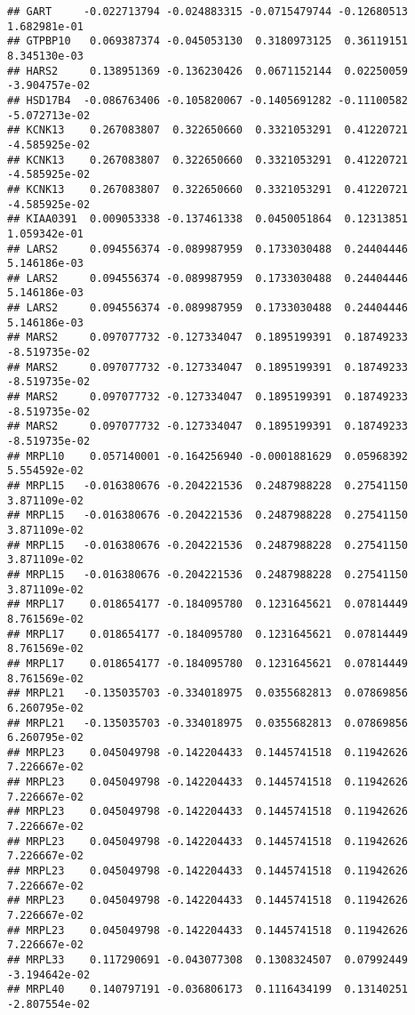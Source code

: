 \documentclass[
]{article}
\begin{document}
\begin{verbatim}
## GART     -0.022713794 -0.024883315 -0.0715479744 -0.12680513  1.682981e-01
## GTPBP10   0.069387374 -0.045053130  0.3180973125  0.36119151  8.345130e-03
## HARS2     0.138951369 -0.136230426  0.0671152144  0.02250059 -3.904757e-02
## HSD17B4  -0.086763406 -0.105820067 -0.1405691282 -0.11100582 -5.072713e-02
## KCNK13    0.267083807  0.322650660  0.3321053291  0.41220721 -4.585925e-02
## KCNK13    0.267083807  0.322650660  0.3321053291  0.41220721 -4.585925e-02
## KCNK13    0.267083807  0.322650660  0.3321053291  0.41220721 -4.585925e-02
## KIAA0391  0.009053338 -0.137461338  0.0450051864  0.12313851  1.059342e-01
## LARS2     0.094556374 -0.089987959  0.1733030488  0.24404446  5.146186e-03
## LARS2     0.094556374 -0.089987959  0.1733030488  0.24404446  5.146186e-03
## LARS2     0.094556374 -0.089987959  0.1733030488  0.24404446  5.146186e-03
## MARS2     0.097077732 -0.127334047  0.1895199391  0.18749233 -8.519735e-02
## MARS2     0.097077732 -0.127334047  0.1895199391  0.18749233 -8.519735e-02
## MARS2     0.097077732 -0.127334047  0.1895199391  0.18749233 -8.519735e-02
## MARS2     0.097077732 -0.127334047  0.1895199391  0.18749233 -8.519735e-02
## MRPL10    0.057140001 -0.164256940 -0.0001881629  0.05968392  5.554592e-02
## MRPL15   -0.016380676 -0.204221536  0.2487988228  0.27541150  3.871109e-02
## MRPL15   -0.016380676 -0.204221536  0.2487988228  0.27541150  3.871109e-02
## MRPL15   -0.016380676 -0.204221536  0.2487988228  0.27541150  3.871109e-02
## MRPL15   -0.016380676 -0.204221536  0.2487988228  0.27541150  3.871109e-02
## MRPL17    0.018654177 -0.184095780  0.1231645621  0.07814449  8.761569e-02
## MRPL17    0.018654177 -0.184095780  0.1231645621  0.07814449  8.761569e-02
## MRPL17    0.018654177 -0.184095780  0.1231645621  0.07814449  8.761569e-02
## MRPL21   -0.135035703 -0.334018975  0.0355682813  0.07869856  6.260795e-02
## MRPL21   -0.135035703 -0.334018975  0.0355682813  0.07869856  6.260795e-02
## MRPL23    0.045049798 -0.142204433  0.1445741518  0.11942626  7.226667e-02
## MRPL23    0.045049798 -0.142204433  0.1445741518  0.11942626  7.226667e-02
## MRPL23    0.045049798 -0.142204433  0.1445741518  0.11942626  7.226667e-02
## MRPL23    0.045049798 -0.142204433  0.1445741518  0.11942626  7.226667e-02
## MRPL23    0.045049798 -0.142204433  0.1445741518  0.11942626  7.226667e-02
## MRPL23    0.045049798 -0.142204433  0.1445741518  0.11942626  7.226667e-02
## MRPL23    0.045049798 -0.142204433  0.1445741518  0.11942626  7.226667e-02
## MRPL33    0.117290691 -0.043077308  0.1308324507  0.07992449 -3.194642e-02
## MRPL40    0.140797191 -0.036806173  0.1116434199  0.13140251 -2.807554e-02

\end{verbatim}
\end{document}
